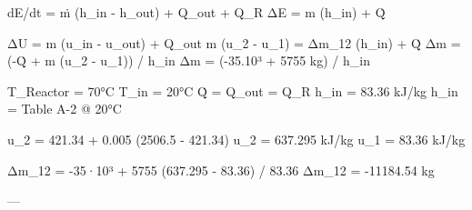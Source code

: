 dE/dt = ṁ (h_in - h_out) + Q_out + Q_R  
ΔE = m (h_in) + Q̇  

ΔU = m (u_in - u_out) + Q_out  
m (u_2 - u_1) = Δm_12 (h_in) + Q̇  
Δm = (-Q̇ + m (u_2 - u_1)) / h_in  
Δm = (-35.10³ + 5755 kg) / h_in  

T_Reactor = 70°C  
T_in = 20°C  
Q̇ = Q_out = Q_R  
h_in = 83.36 kJ/kg  
h_in = Table A-2 @ 20°C  

u_2 = 421.34 + 0.005 (2506.5 - 421.34)  
u_2 = 637.295 kJ/kg  
u_1 = 83.36 kJ/kg  

Δm_12 = -35·10³ + 5755 (637.295 - 83.36) / 83.36  
Δm_12 = -11184.54 kg  

---